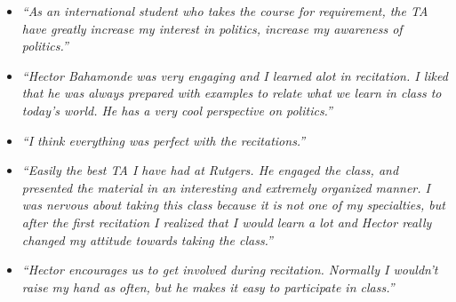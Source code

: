 {\begin{itemize}
\item \emph{``As an international student who takes the course for requirement, the TA have greatly increase my interest in politics, increase my awareness of politics.''}

\item \emph{``Hector Bahamonde was very engaging and I learned alot in recitation. I liked that he was always prepared with examples to relate what we learn in class to today's world. He has a very cool perspective on politics.''}

\item \emph{``I think everything was perfect with the recitations.''}

\item \emph{``Easily the best TA I have had at Rutgers. He engaged the class, and presented the material in an interesting and extremely organized manner. I was nervous about taking this class because it is not one of my specialties, but after the first recitation I realized that I would learn a lot and Hector really changed my attitude towards taking the class.''}

\item \emph{``Hector encourages us to get involved during recitation. Normally I wouldn't raise my hand as often, but he makes it easy to participate in class.''}

\end{itemize}

}

